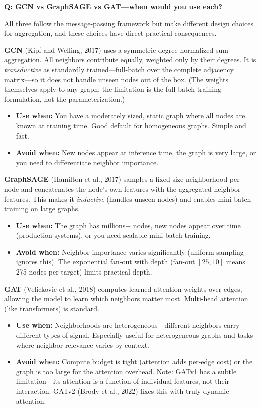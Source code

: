 \begin{interviewq}
\textbf{Q: GCN vs GraphSAGE vs GAT---when would you use each?}

 \quad {} \quad \badgefreq{\freqmed}

\stronganswer

All three follow the message-passing framework but make different design choices for aggregation, and these choices have direct practical consequences.

\textbf{GCN} (Kipf and Welling, 2017) uses a symmetric degree-normalized sum aggregation. All neighbors contribute equally, weighted only by their degrees. It is \textit{transductive} as standardly trained---full-batch over the complete adjacency matrix---so it does not handle unseen nodes out of the box. (The weights themselves apply to any graph; the limitation is the full-batch training formulation, not the parameterization.)
\begin{itemize}
    \item \textbf{Use when:} You have a moderately sized, static graph where all nodes are known at training time. Good default for homogeneous graphs. Simple and fast.
    \item \textbf{Avoid when:} New nodes appear at inference time, the graph is very large, or you need to differentiate neighbor importance.
\end{itemize}

\textbf{GraphSAGE} (Hamilton et al., 2017) samples a fixed-size neighborhood per node and concatenates the node's own features with the aggregated neighbor features. This makes it \textit{inductive} (handles unseen nodes) and enables mini-batch training on large graphs.
\begin{itemize}
    \item \textbf{Use when:} The graph has millions+ nodes, new nodes appear over time (production systems), or you need scalable mini-batch training.
    \item \textbf{Avoid when:} Neighbor importance varies significantly (uniform sampling ignores this). The exponential fan-out with depth (fan-out $[25, 10]$ means 275 nodes per target) limits practical depth.
\end{itemize}

\textbf{GAT} (Velickovic et al., 2018) computes learned attention weights over edges, allowing the model to learn which neighbors matter most. Multi-head attention (like transformers) is standard.
\begin{itemize}
    \item \textbf{Use when:} Neighborhoods are heterogeneous---different neighbors carry different types of signal. Especially useful for heterogeneous graphs and tasks where neighbor relevance varies by context.
    \item \textbf{Avoid when:} Compute budget is tight (attention adds per-edge cost) or the graph is too large for the attention overhead. Note: GATv1 has a subtle limitation---its attention is a function of individual features, not their interaction. GATv2 (Brody et al., 2022) fixes this with truly dynamic attention.
\end{itemize}


\end{interviewq}
